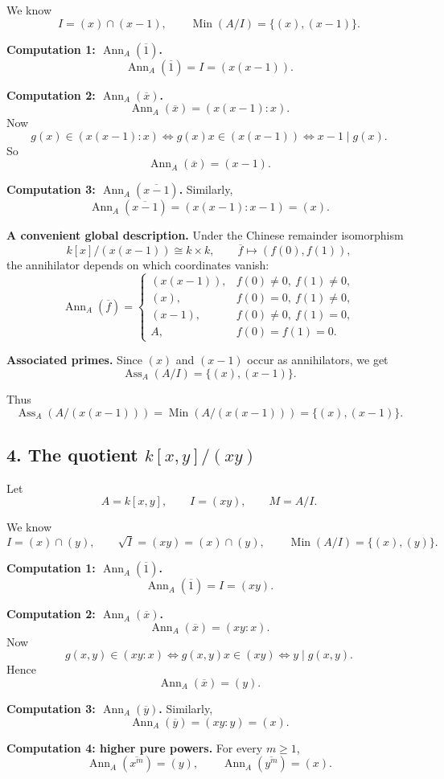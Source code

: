 \documentclass[12pt,a4paper]{article}
\theoremstyle{notespace}
\DeclareMathOperator{\Ass}{Ass}
\DeclareMathOperator{\Ann}{Ann}
\DeclareMathOperator{\Min}{Min}
\begin{document}
We know
\[
I=(x)\cap(x-1),
\qquad
\Min(A/I)=\{(x),(x-1)\}.
\]

\textbf{Computation 1: \(\Ann_A(\overline 1)\).}
\[
\Ann_A(\overline 1)=I=(x(x-1)).
\]

\textbf{Computation 2: \(\Ann_A(\overline x)\).}
\[
\Ann_A(\overline x)=(x(x-1):x).
\]
Now
\[
g(x)\in (x(x-1):x)
\iff g(x)x\in (x(x-1))
\iff x-1\mid g(x).
\]
So
\[
\Ann_A(\overline x)=(x-1).
\]

\textbf{Computation 3: \(\Ann_A(\overline{x-1})\).}
Similarly,
\[
\Ann_A(\overline{x-1})=(x(x-1):x-1)=(x).
\]

\textbf{A convenient global description.}
Under the Chinese remainder isomorphism
\[
k[x]/(x(x-1))\cong k\times k,
\qquad
\overline f\longmapsto (f(0),f(1)),
\]
the annihilator depends on which coordinates vanish:
\[
\Ann_A(\overline f)=
\begin{cases}
	(x(x-1)), & f(0)\neq 0,\ f(1)\neq 0,\\[1mm]
	(x), & f(0)=0,\ f(1)\neq 0,\\[1mm]
	(x-1), & f(0)\neq 0,\ f(1)=0,\\[1mm]
	A, & f(0)=f(1)=0.
\end{cases}
\]

\textbf{Associated primes.}
Since \((x)\) and \((x-1)\) occur as annihilators, we get
\[
\Ass_A(A/I)=\{(x),(x-1)\}.
\]

Thus
\[
\Ass_A(A/(x(x-1)))=\Min(A/(x(x-1)))=\{(x),(x-1)\}.
\]

\subsection{4. The quotient \(k[x,y]/(xy)\)}

Let
\[
A=k[x,y],\qquad I=(xy),\qquad M=A/I.
\]

We know
\[
I=(x)\cap(y),
\qquad
\sqrt I=(xy)=(x)\cap(y),
\qquad
\Min(A/I)=\{(x),(y)\}.
\]

\textbf{Computation 1: \(\Ann_A(\overline 1)\).}
\[
\Ann_A(\overline 1)=I=(xy).
\]

\textbf{Computation 2: \(\Ann_A(\overline x)\).}
\[
\Ann_A(\overline x)=(xy:x).
\]
Now
\[
g(x,y)\in (xy:x)
\iff g(x,y)x\in (xy)
\iff y\mid g(x,y).
\]
Hence
\[
\Ann_A(\overline x)=(y).
\]

\textbf{Computation 3: \(\Ann_A(\overline y)\).}
Similarly,
\[
\Ann_A(\overline y)=(xy:y)=(x).
\]

\textbf{Computation 4: higher pure powers.}
For every \(m\ge 1\),
\[
\Ann_A(\overline{x^m})=(y),
\qquad
\Ann_A(\overline{y^m})=(x).
\]
\end{document}
